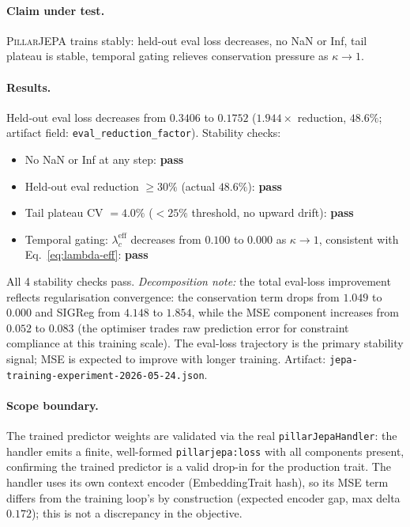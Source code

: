\paragraph{Claim under test.}
\textsc{PillarJEPA} trains stably: held-out eval loss decreases, no NaN or Inf,
tail plateau is stable, temporal gating relieves conservation pressure as
$\kappa \to 1$.

\paragraph{Results.}
Held-out eval loss decreases from $0.3406$ to $0.1752$ ($1.944\times$
reduction, $48.6\%$; artifact field: \texttt{eval\_reduction\_factor}).
Stability checks:

\begin{itemize}
  \item No NaN or Inf at any step: \textbf{pass}
  \item Held-out eval reduction $\geq 30\%$ (actual $48.6\%$): \textbf{pass}
  \item Tail plateau CV $= 4.0\%$ ($< 25\%$ threshold, no upward drift): \textbf{pass}
  \item Temporal gating: $\lambda_c^{\mathrm{eff}}$ decreases from $0.100$ to
        $0.000$ as $\kappa \to 1$, consistent with Eq.~\ref{eq:lambda-eff}: \textbf{pass}
\end{itemize}

All 4 stability checks pass.  \emph{Decomposition note:} the total eval-loss
improvement reflects regularisation convergence: the conservation term drops from
$1.049$ to $0.000$ and SIGReg from $4.148$ to $1.854$, while the MSE component
increases from $0.052$ to $0.083$ (the optimiser trades raw prediction error for
constraint compliance at this training scale).  The eval-loss trajectory is the
primary stability signal; MSE is expected to improve with longer training.
Artifact: \texttt{jepa-training-experiment-2026-05-24.json}.

\paragraph{Scope boundary.}
The trained predictor weights are validated via the real
\texttt{pillarJepaHandler}: the handler emits a finite, well-formed
\texttt{pillarjepa:loss} with all components present, confirming the trained
predictor is a valid drop-in for the production trait.  The handler uses its
own context encoder (EmbeddingTrait hash), so its MSE term differs from the
training loop's by construction (expected encoder gap, max delta $0.172$);
this is not a discrepancy in the objective.

